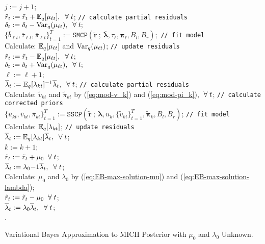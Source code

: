 \begin{algorithm}
{{      $j := j + 1$; \\
    }
     {
      $\tilde{r}_t := \tilde{r}_t + \mathbb{E}_q[\mu_{\ell t}],\; \;\forall\; t$; \texttt{// calculate partial residuals} \\
      $\delta_t := \delta_t -  \text{Var}_q(\mu_{\ell t}),\; \;\forall\; t;$ \\
      $\{\overline{b}_{\ell t}, \overline{\tau}_{\ell t}, \overline{\pi}_{\ell t}\}_{t=1}^T := \texttt{SMCP}\left(\tilde{\mathbf{r}} \:;\: \overline{\pmb{\lambda}}, \tau_{\ell}, \pmb{\pi}_{\ell}, B_l,B_r\right);$ \texttt{// fit model} \\
      Calculate: $\mathbb{E}_q[\mu_{\ell t}]$ and $\text{Var}_q(\mu_{\ell t})$; \texttt{// update residuals} \\
      $\tilde{r}_t := \tilde{r}_t - \mathbb{E}_q[\mu_{\ell t}],\; \;\forall\; t$; \\
      $\delta_t := \delta_t + \text{Var}_q(\mu_{\ell t}),\; \;\forall\; t;$ \\
      $\ell := \ell + 1$; \\
    }
     {
      $\overline{\lambda}_t := \mathbb{E}_q[\lambda_{k t}]^{-1}\overline{\lambda}_t, \; \;\forall\; t$; \texttt{// calculate partial residuals}\\
      Calculate: $\tilde{v}_{kt}$ and $\tilde{\pi}_{kt}$ by (\ref{eq:mod-v_k}) and (\ref{eq:mod-pi_k}), $\;\forall\; t$; \texttt{// calculate corrected priors} \\
      $\{\overline{u}_{kt}, \overline{v}_{kt}, \overline{\pi}_{kt}\}_{t=1}^T := \texttt{SSCP}\left(\tilde{\mathbf{r}} 
      \:;\:\overline{\pmb{\lambda}}, u_k, \{\tilde{v}_{kt}\}_{t=1}^T, \tilde{\pmb{\pi}}_k, B_l,B_r\right)$; \texttt{// fit model} \\
      Calculate: $\mathbb{E}_q[\lambda_{k t}]$; \texttt{// update residuals} \\
      $\overline{\lambda}_t := \mathbb{E}_q[\lambda_{kt}]\overline{\lambda}_t, \; \;\forall\; t$; \\
      $k := k + 1$; \\
    }
    $\tilde{r}_t := \tilde{r}_t + \mu_0\; \;\forall\; t$; \\
    $\overline{\lambda}_t := \lambda_0{-1}\overline{\lambda}_t, \; \;\forall\; t$; \\
    Calculate: $\mu_0$ and $\lambda_0$ by (\ref{eq:EB-max-solution-mu}) and (\ref{eq:EB-max-solution-lambda});\\ 
    $\tilde{r}_t := \tilde{r}_t - \mu_0\; \;\forall\; t$; \\
    $\overline{\lambda}_t := \lambda_0\overline{\lambda}_t, \; \;\forall\; t$; \\
  }
  .
  \caption{Variational Bayes Approximation to MICH Posterior with $\mu_0$ and $\lambda_0$ Unknown.}
\end{algorithm}
